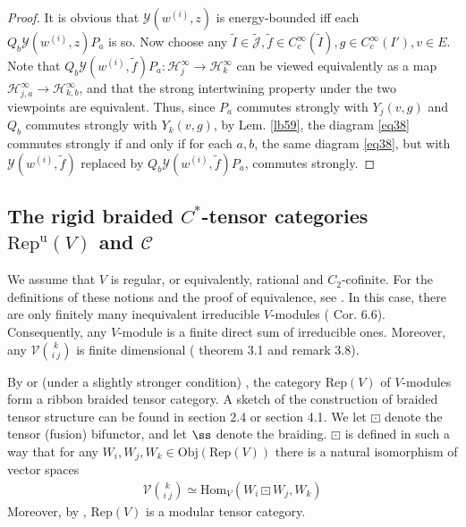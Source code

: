 \documentclass[12pt,a4paper]{article}
\theoremstyle{definition}
\theoremstyle{plain}
\newcommand{\mc}{\mathcal}
\newcommand{\wtd}{\widetilde}
\newcommand{\Hom}{\mathrm{Hom}}
\newcommand{\Rep}{\mathrm{Rep}}
\newcommand{\scr}{\mathscr}
\newcommand{\Jtd}{\widetilde{\mathcal J}}
\newcommand{\RepuV}{\mathrm{Rep}^{\mathrm u}(V)}
\newcommand{\Obj}{\mathrm{Obj}}
\numberwithin{equation}{subsection}
\begin{document}
\begin{proof}
It is obvious that $\mc Y(w^{(i)},z)$ is energy-bounded iff each $Q_b\mc Y(w^{(i)},z) P_a$ is so. Now choose any $\wtd I\in\Jtd,\wtd f\in C_c^\infty(\wtd I),g\in C_c^\infty(I'),v\in E$. Note that $Q_b\mc Y(w^{(i)},\wtd f)P_a:\mc H_j^\infty\rightarrow\mc H_k^\infty$ can be viewed equivalently as a map $\mc H_{j,a}^\infty\rightarrow\mc H_{k,b}^\infty$, and that the strong intertwining property under the two viewpoints are equivalent. Thus, since $P_a$ commutes strongly with $Y_j(v,g)$ and $Q_b$ commutes strongly with $Y_k(v,g)$, by Lem. \ref{lb59}, the diagram \eqref{eq38} commutes strongly if and only if for each $a,b$, the same diagram \eqref{eq38}, but with $\mc Y(w^{(i)},\wtd f)$ replaced by $Q_b\mc Y(w^{(i)},\wtd f)P_a$, commutes strongly.
\end{proof}







\subsection{The rigid braided $C^*$-tensor categories $\RepuV$ and $\scr C$}\label{lb87}


We assume that $V$ is regular, or equivalently, rational and $C_2$-cofinite. For the definitions of these notions and the proof of equivalence, see \cite{ABD04}. In this case, there are only finitely many inequivalent irreducible $V$-modules (\cite{Hua05b} Cor. 6.6). Consequently, any $V$-module is a finite direct sum of irreducible ones. Moreover, any $\mc V{k\choose i~j}$ is finite dimensional (\cite{Hua05a} theorem 3.1 and remark 3.8). 

By \cite{HL95a,HL95b,HL95c,Hua95,Hua05a} or (under a slightly stronger condition) \cite{NT05}, the category $\Rep(V)$ of  $V$-modules form a  ribbon braided tensor category. A sketch of the construction of braided tensor structure can be found in \cite{Gui19a} section 2.4 or \cite{Gui21a} section 4.1.  We let $\boxdot$ denote the tensor (fusion) bifunctor, and let $\ss$ denote the braiding. $\boxdot$ is defined in such a way that for any $W_i,W_j,W_k\in\Obj(\Rep(V))$ there is a natural isomorphism of vector spaces
\begin{align}
\mc V{k\choose i~j}\simeq\Hom_V(W_i\boxdot W_j,W_k)\label{eq47}
\end{align}
Moreover, by \cite{Hua05b,Hua08a,Hua08b}, $\Rep(V)$ is a modular tensor category. 
\end{document}
